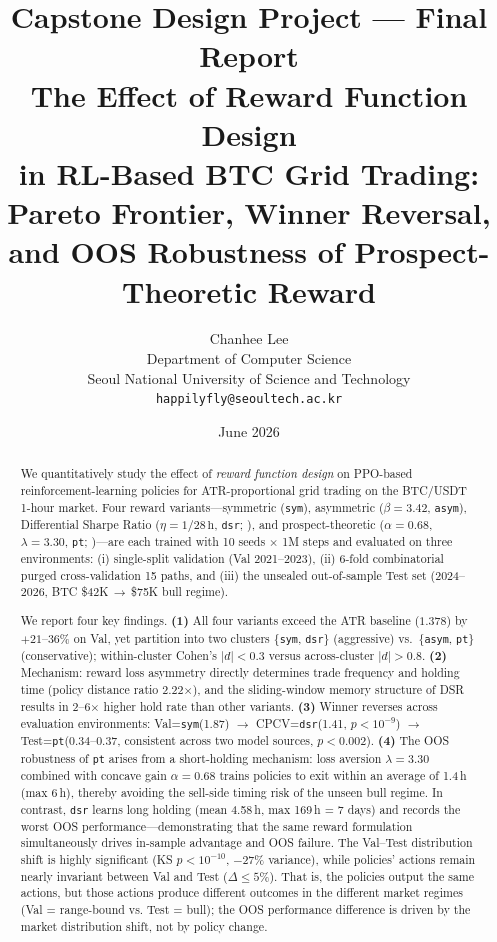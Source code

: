 \documentclass[11pt, a4paper]{article}
\title{
    \vspace{-1cm}
    {\large Capstone Design Project --- Final Report}\\[0.8em]
    \textbf{The Effect of Reward Function Design\\
    in RL-Based BTC Grid Trading:\\
    Pareto Frontier, Winner Reversal,\\
    and OOS Robustness of Prospect-Theoretic Reward}
}
\author{
    Chanhee Lee\\
    Department of Computer Science\\
    Seoul National University of Science and Technology\\
    \texttt{happilyfly@seoultech.ac.kr}
}
\date{June 2026}
\begin{document}
\maketitle
\thispagestyle{empty}

\begin{abstract}
We quantitatively study the effect of \emph{reward function design} on PPO-based
reinforcement-learning policies for ATR-proportional grid trading on the BTC/USDT
1-hour market. Four reward variants---symmetric (\texttt{sym}), asymmetric
($\beta=3.42$, \texttt{asym}), Differential Sharpe Ratio
($\eta=1/28\,\mathrm{h}$, \texttt{dsr}; \citealt{moody2001dsr}), and
prospect-theoretic ($\alpha=0.68$, $\lambda=3.30$, \texttt{pt};
\citealt{kahneman1979prospect})---are each trained with 10 seeds $\times$ 1M steps
and evaluated on three environments: (i) single-split validation
(Val 2021--2023), (ii) 6-fold combinatorial purged cross-validation
\citep{lopezdeprado2018advances} 15 paths, and (iii) the unsealed
out-of-sample Test set (2024--2026, BTC \$42K\,$\to$\,\$75K bull regime).

We report four key findings.
\textbf{(1)} All four variants exceed the ATR baseline ($1.378$) by
$+21$--$36\%$ on Val, yet partition into two clusters
\{\texttt{sym}, \texttt{dsr}\} (aggressive) vs.\
\{\texttt{asym}, \texttt{pt}\} (conservative); within-cluster Cohen's $|d|<0.3$
versus across-cluster $|d|>0.8$.
\textbf{(2)} Mechanism: reward loss asymmetry directly determines trade frequency
and holding time (policy distance ratio 2.22$\times$), and the sliding-window
memory structure of DSR results in 2--6$\times$ higher hold rate than other
variants.
\textbf{(3)} Winner reverses across evaluation environments: Val=\texttt{sym}(1.87)
$\to$ CPCV=\texttt{dsr}(1.41, $p<10^{-9}$) $\to$ Test=\texttt{pt}(0.34--0.37,
consistent across two model sources, $p<0.002$).
\textbf{(4)} The OOS robustness of \texttt{pt} arises from a short-holding
mechanism: loss aversion $\lambda=3.30$ combined with concave gain $\alpha=0.68$
trains policies to exit within an average of 1.4\,h (max 6\,h), thereby avoiding the
sell-side timing risk of the unseen bull regime. In contrast, \texttt{dsr} learns
long holding (mean 4.58\,h, max 169\,h = 7 days) and records the worst OOS
performance---demonstrating that the same reward formulation simultaneously
drives in-sample advantage and OOS failure.
The Val--Test distribution shift is highly significant
(KS $p<10^{-10}$, $-27\%$ variance), while policies' actions remain nearly
invariant between Val and Test ($\Delta \leq 5\%$). That is, the policies
output the same actions, but those actions produce different outcomes in the
different market regimes (Val = range-bound vs. Test = bull); the OOS
performance difference is driven by the market distribution shift, not by
policy change.


\end{abstract}
\end{document}
